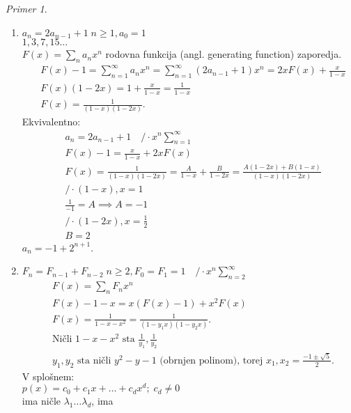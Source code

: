 \documentclass[a4paper, 12pt]{book}
\theoremstyle{definition}
\theoremstyle{remark}
\newtheorem*{ex}{Primer}
\begin{document}
\begin{ex} \text{} \\
  \begin{enumerate}[label=(\alph*)]
    \item $a_n = 2 a_{n-1} + 1 \; n \geq 1, a_0 = 1$ \\
      $1, 3, 7, 15 \dots$ \\
      $F(x) = \sum_n a_n x^n$ rodovna funkcija (angl. generating function) zaporedja.
      \begin{align*}
        &F(x) - 1 = \sum_{n=1}^{\infty} a_n x^n = \sum_{n=1}^{\infty} (2 a_{n-1} + 1) x^n = 2 x F(x) + \frac{x}{1-x} \\
        &F(x) (1-2x) = 1 + \frac{x}{1-x} = \frac{1}{1-x} \\
        &F(x) = \frac{1}{(1-x) (1-2x)}.
      \end{align*}
      Ekvivalentno:
      \begin{align*}
        &a_n = 2 a_{n-1} + 1 \quad / \cdot x^n \sum_{n=1}^{\infty} \\
        &F(x) - 1 = \frac{x}{1-x} + 2 x F(x) \\
        &F(x) = \frac{1}{(1-x) (1-2x)} = \frac{A}{1-x} + \frac{B}{1-2x} = \frac{A(1-2x) + B(1-x)}{(1-x) (1-2x)} \\
        &/ \cdot (1-x), x=1 \\
        &\frac{1}{-1} = A \implies A = -1 \\
        &/ \cdot (1-2x), x=\frac{1}{2} \\
        &B = 2
      \end{align*}
      $a_n = -1 + 2^{n+1}$.
    \item $F_n = F_{n-1} + F_{n-2} \; n \geq 2, F_0 = F_1 = 1 \quad / \cdot x^n \sum_{n=2}^{\infty}$
      \begin{align*}
        &F(x) = \sum_n F_n x^n \\
        &F(x) - 1 - x = x(F(x) - 1) + x^2 F(x) \\
        &F(x) = \frac{1}{1-x-x^2} = \frac{1}{(1-y_1x)(1-y_2x)}. \\
        &\text{Ničli } 1-x-x^2 \text{ sta } \frac{1}{y_1}, \frac{1}{y_2} \\
        &y_1, y_2 \text{ sta ničli } y^2-y-1 \text{ (obrnjen polinom), torej } x_1,x_2 = \frac{-1 \pm \sqrt{5}}{2}.
      \end{align*}
      V splošnem: \\
      $p(x) = c_0 + c_1 x + \dots + c_d x^d; \; c_d \neq 0$ \\
      ima ničle $\lambda_1 \dots \lambda_d$, ima \\

\end{enumerate}
\end{ex}
\end{document}
